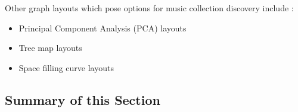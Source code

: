 Other graph layouts which pose options for music collection discovery include \cite{Muelder:2010fk}:

\begin{itemize}
	\item Principal Component Analysis (PCA) layouts 
	\item Tree map layouts 
	\item Space filling curve layouts
\end{itemize}



\subsection{Summary of this Section}